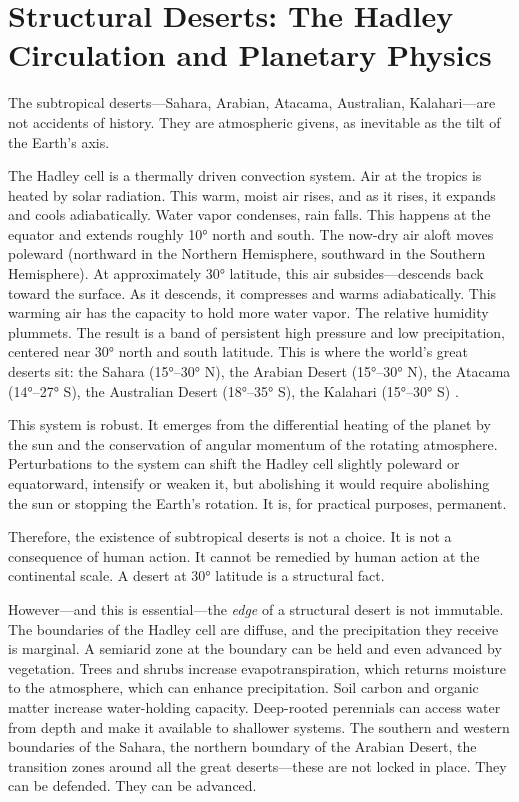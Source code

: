\documentclass[12pt,a4paper]{article}
\begin{document}
\section{Structural Deserts: The Hadley Circulation and Planetary Physics}

The subtropical deserts—Sahara, Arabian, Atacama, Australian, Kalahari—are not accidents of history. They are atmospheric givens, as inevitable as the tilt of the Earth's axis.

The Hadley cell is a thermally driven convection system. Air at the tropics is heated by solar radiation. This warm, moist air rises, and as it rises, it expands and cools adiabatically. Water vapor condenses, rain falls. This happens at the equator and extends roughly 10° north and south. The now-dry air aloft moves poleward (northward in the Northern Hemisphere, southward in the Southern Hemisphere). At approximately 30° latitude, this air subsides—descends back toward the surface. As it descends, it compresses and warms adiabatically. This warming air has the capacity to hold more water vapor. The relative humidity plummets. The result is a band of persistent high pressure and low precipitation, centered near 30° north and south latitude. This is where the world's great deserts sit: the Sahara (15°–30° N), the Arabian Desert (15°–30° N), the Atacama (14°–27° S), the Australian Desert (18°–35° S), the Kalahari (15°–30° S) \citep{Held:1975}.

This system is robust. It emerges from the differential heating of the planet by the sun and the conservation of angular momentum of the rotating atmosphere. Perturbations to the system can shift the Hadley cell slightly poleward or equatorward, intensify or weaken it, but abolishing it would require abolishing the sun or stopping the Earth's rotation. It is, for practical purposes, permanent.

Therefore, the existence of subtropical deserts is not a choice. It is not a consequence of human action. It cannot be remedied by human action at the continental scale. A desert at 30° latitude is a structural fact.

However—and this is essential—the \textit{edge} of a structural desert is not immutable. The boundaries of the Hadley cell are diffuse, and the precipitation they receive is marginal. A semiarid zone at the boundary can be held and even advanced by vegetation. Trees and shrubs increase evapotranspiration, which returns moisture to the atmosphere, which can enhance precipitation. Soil carbon and organic matter increase water-holding capacity. Deep-rooted perennials can access water from depth and make it available to shallower systems. The southern and western boundaries of the Sahara, the northern boundary of the Arabian Desert, the transition zones around all the great deserts—these are not locked in place. They can be defended. They can be advanced.
\end{document}
